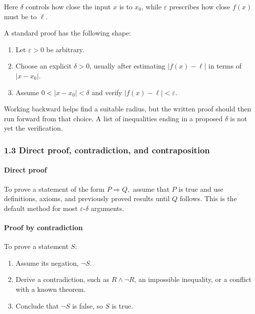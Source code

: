 \documentclass[11pt,a4paper]{article}
\begin{document}
Here \(\delta\) controls how close the input \(x\) is to \(x_0\), while
\(\varepsilon\) prescribes how close \(f(x)\) must be to \(\ell\).

A standard proof has the following shape:

\begin{enumerate}
\def\labelenumi{\arabic{enumi}.}
\item
  Let \(\varepsilon>0\) be arbitrary.
\item
  Choose an explicit \(\delta>0\), usually after estimating
  \(|f(x)-\ell|\) in terms of \(|x-x_0|\).
\item
  Assume \(0<|x-x_0|<\delta\) and verify \(|f(x)-\ell|<\varepsilon\).
\end{enumerate}

Working backward helps find a suitable radius, but the written proof
should then run forward from that choice. A list of inequalities ending
in a proposed \(\delta\) is not yet the verification.

\subsubsection{1.3 Direct proof, contradiction, and
contraposition}\label{direct-proof-contradiction-and-contraposition}

\paragraph{Direct proof}\label{direct-proof}

To prove a statement of the form \(P\Rightarrow Q,\) assume that \(P\)
is true and use definitions, axioms, and previously proved results until
\(Q\) follows. This is the default method for most
\(\varepsilon\)-\(\delta\) arguments.

\paragraph{Proof by contradiction}\label{proof-by-contradiction}

To prove a statement \(S\):

\begin{enumerate}
\def\labelenumi{\arabic{enumi}.}
\item
  Assume its negation, \(\neg S\).
\item
  Derive a contradiction, such as \(R\land\neg R\), an impossible
  inequality, or a conflict with a known theorem.
\item
  Conclude that \(\neg S\) is false, so \(S\) is true.
\end{enumerate}
\end{document}
